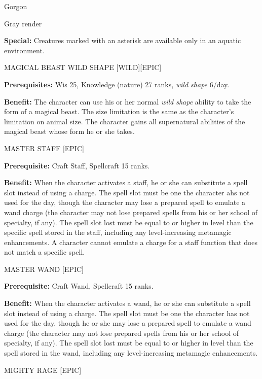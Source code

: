 \documentclass{article}
\begin{document}
Gorgon

Gray render

\vspace{12pt}
\textbf{Special:} Creatures marked with an asterisk are available only in an aquatic 
environment.

\vspace{12pt}
MAGICAL BEAST WILD SHAPE [WILD][EPIC]

\textbf{Prerequisites:} Wis 25, Knowledge (nature) 27 ranks, \textit{wild shape 
}6/day. 

\textbf{Benefit:} The character can use his or her normal \textit{wild shape }ability 
to take the form of a magical beast. The size limitation is the same as the character's 
limitation on animal size. The character gains all supernatural abilities of the 
magical beast whose form he or she takes. 

\vspace{12pt}
MASTER STAFF [EPIC] 

\textbf{Prerequisite:} Craft Staff, Spellcraft 15 ranks. 

\textbf{Benefit:} When the character activates a staff, he or she can substitute 
a spell slot instead of using a charge. The spell slot must be one the character 
ahs not used for the day, though the character may lose a prepared spell to emulate 
a wand charge (the character may not lose prepared spells from his or her school 
of specialty, if any). The spell slot lost must be equal to or higher in level 
than the specific spell stored in the staff, including any level-increasing metamagic 
enhancements. A character cannot emulate a charge for a staff function that does 
not match a specific spell.

\vspace{12pt}
MASTER WAND [EPIC] 

\textbf{Prerequisite:} Craft Wand, Spellcraft 15 ranks. 

\textbf{Benefit:} When the character activates a wand, he or she can substitute 
a spell slot instead of using a charge. The spell slot must be one the character 
has not used for the day, though he or she may lose a prepared spell to emulate 
a wand charge (the character may not lose prepared spells from his or her school 
of specialty, if any). The spell slot lost must be equal to or higher in level 
than the spell stored in the wand, including any level-increasing metamagic enhancements. 

\vspace{12pt}
MIGHTY RAGE [EPIC] 
\end{document}

